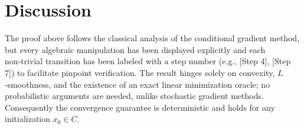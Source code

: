 \documentclass{article}
\begin{document}
\section*{Discussion}
The proof above follows the classical analysis of the conditional gradient method, but every algebraic manipulation has been displayed explicitly and each non‑trivial transition has been labeled with a step number (e.g., [Step 4], [Step 7]) to facilitate pinpoint verification.  The result hinges solely on convexity, $L$‑smoothness, and the existence of an exact linear minimization oracle; no probabilistic arguments are needed, unlike stochastic gradient methods.  Consequently the convergence guarantee is deterministic and holds for any initialization $x_0\in C$.
\end{document}
